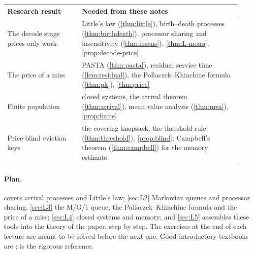 \begin{center}\small
\begin{tabular}{@{}p{0.3\linewidth}p{0.64\linewidth}@{}}
\toprule
Research result & Needed from these notes \\
\midrule
The decode stage prices only work &
  Little's law (\cref{thm:little}), birth--death processes
  (\cref{thm:birthdeath}), processor sharing and insensitivity
  (\cref{thm:insens}), \cref{thm:L-mono}, \cref{prop:decode-price} \\
The price of a miss &
  PASTA (\cref{thm:pasta}), residual service time (\cref{lem:residual}),
  the Pollaczek--Khinchine formula (\cref{thm:pk}), \cref{thm:price} \\
Finite population &
  closed systems, the arrival theorem (\cref{thm:arrival}), mean value
  analysis (\cref{thm:mva}), \cref{prop:finite} \\
Price-blind eviction keys &
  the covering knapsack, the threshold rule (\cref{thm:threshold}),
  \cref{prop:blind}; Campbell's theorem (\cref{thm:campbell}) for the
  memory estimate \\
\bottomrule
\end{tabular}
\end{center}

\paragraph{Plan.}  covers arrival processes and Little's law;
\cref{sec:L2} Markovian queues and processor sharing; \cref{sec:L3} the
M/G/1 queue, the Pollaczek--Khinchine formula and the price of a miss;
\cref{sec:L4} closed systems and memory; and \cref{sec:L5} assembles these tools into the theory of the paper, step by step. The exercises at the end of each
lecture are meant to be solved before the next one. Good introductory
textbooks are \cite{kleinrock1975,harchol2013}; \cite{asmussen2003} is the
rigorous reference.
